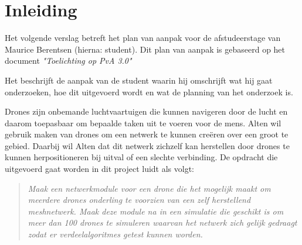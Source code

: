 \documentclass[a4paper, 11pt, oneside]{report}
\begin{document}

\tableofcontents
\clearpage







\chapter{Inleiding}
\label{chapter:inleiding}
Het volgende verslag betreft het plan van aanpak voor de afstudeerstage van Maurice Berentsen (hierna: student).
Dit plan van aanpak is gebaseerd op het document \textit{"Toelichting op PvA 3.0"} \cite{HoePVA}

Het beschrijft de aanpak van de student waarin hij omschrijft wat hij gaat onderzoeken, 
hoe dit uitgevoerd wordt en wat de planning van het onderzoek is.

Drones zijn onbemande luchtvaartuigen die kunnen navigeren door de lucht en daarom toepasbaar om bepaalde taken uit te voeren voor de mens.
Alten wil gebruik maken van drones om een netwerk te kunnen creëren over een groot te gebied. 
Daarbij wil Alten dat dit netwerk zichzelf kan herstellen door drones te kunnen herpositioneren bij uitval of een slechte verbinding.
De opdracht die uitgevoerd gaat worden in dit project luidt als volgt:
\begin{quotation}
	\textit{Maak een netwerkmodule voor een drone die het mogelijk maakt om meerdere drones onderling te voorzien van een zelf herstellend meshnetwerk. Maak deze module na in een simulatie die geschikt is om meer dan 100 drones te simuleren waarvan het netwerk zich gelijk gedraagt zodat er verdeelalgoritmes getest kunnen worden.}
\end{quotation}
\end{document}
